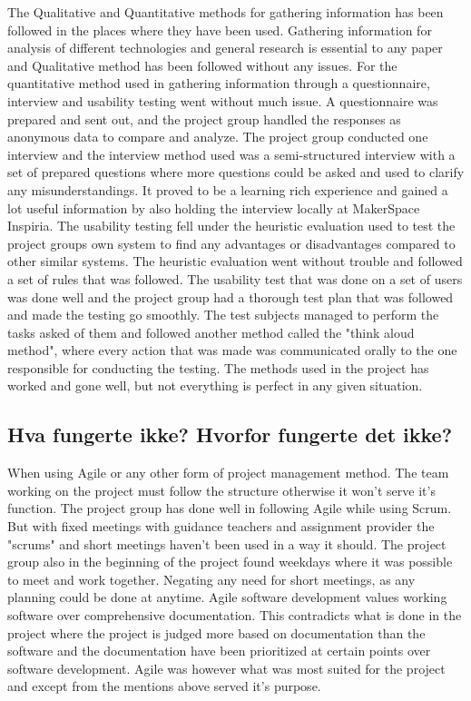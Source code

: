 The Qualitative and Quantitative methods for gathering information has been followed in the places where they have been used. Gathering information for analysis of different technologies and general research is essential to any paper and Qualitative method has been followed without any issues. For the quantitative method used in gathering information through a questionnaire, interview and usability testing went without much issue. A questionnaire was prepared and sent out, and the project group handled the responses as anonymous data to compare and analyze. The project group conducted one interview and the interview method used was a semi-structured interview with a set of prepared questions where more questions could be asked and used to clarify any misunderstandings. It proved to be a learning rich experience and gained a lot useful information by also holding the interview locally at MakerSpace Inspiria. 
The usability testing fell under the heuristic evaluation used to test the project groups own system to find any advantages or disadvantages compared to other similar systems. The heuristic evaluation went without trouble and followed a set of rules that was followed. The usability test that was done on a set of users was done well and the project group had a thorough test plan that was followed and made the testing go smoothly. The test subjects managed to perform the tasks asked of them and followed another method called the "think aloud method", where every action that was made was communicated orally to the one responsible for conducting the testing. The methods used in the project has worked and gone well, but not everything is perfect in any given situation.               
\subsection{Hva fungerte ikke? Hvorfor fungerte det ikke?}
When using Agile or any other form of project management method. The team working on the project must follow the structure otherwise it won't serve it's function. The project group has done well in following Agile while using Scrum. But with fixed meetings with guidance teachers and assignment provider the "scrums" and short meetings haven't been used in a way it should. The project group also in the beginning of the project found weekdays where it was possible to meet and work together. Negating any need for short meetings, as any planning could be done at anytime. Agile software development values working software over comprehensive documentation. This contradicts what is done in the project where the project is judged more based on documentation than the software and the documentation have been prioritized at certain points over software development. Agile was however what was most suited for the project and except from the mentions above served it's purpose. 


